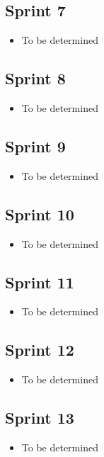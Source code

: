 \subsection{Sprint 7}
\begin{itemize}
	\item To be determined
\end{itemize}

\subsection{Sprint 8}
\begin{itemize}
	\item To be determined
\end{itemize}

\subsection{Sprint 9}
\begin{itemize}
	\item To be determined
\end{itemize}

\subsection{Sprint 10}
\begin{itemize}
	\item To be determined
\end{itemize}

\subsection{Sprint 11}
\begin{itemize}
	\item To be determined
\end{itemize}

\subsection{Sprint 12}
\begin{itemize}
	\item To be determined
\end{itemize}

\subsection{Sprint 13}
\begin{itemize}
	\item To be determined
\end{itemize}

